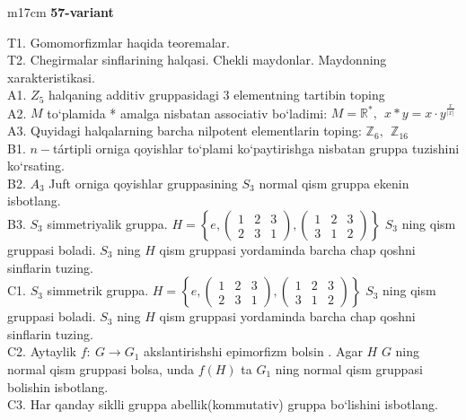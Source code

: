 \documentclass{article}
\begin{document}
\begin{tabular}{m{17cm}}
\textbf{57-variant}
\newline

T1. Gomomorfizmlar haqida teoremalar. \\
T2. Chegirmalar sinflarining halqasi. Chekli maydonlar. Maydonning xarakteristikasi. \\
A1. \(Z_{5}\) halqaning additiv gruppasidagi 3 elementning tartibin toping \\
A2. \(M\) to`plamida * amalga nisbatan associativ bo`ladimi: \(M = \mathbb{R}^{*},\ \ x*y = x \cdot y^{\frac{x}{|x|}}\) \\
A3. Quyidagi halqalarning barcha nilpotent elementlarin toping: \(\mathbb{Z}_{6},\ \ \mathbb{Z}_{16}\) \\
B1. \(n -\)tártipli orniga qoyishlar to`plami ko`paytirishga nisbatan gruppa tuzishini ko`rsating. \\
B2. \(A_{3}\) Juft orniga qoyishlar gruppasining \(S_{3}\) normal qism gruppa ekenin isbotlang. \\
B3. \(S_{3}\) simmetriyalik gruppa. \(H = \left\{ e,\begin{pmatrix}
1 & 2 & 3 \\
2 & 3 & 1
\end{pmatrix},\begin{pmatrix}
1 & 2 & 3 \\
3 & 1 & 2
\end{pmatrix} \right\}\) \(S_{3}\) ning qism gruppasi bola\textquotesingle di. \(S_{3}\) ning \(H\) qism gruppasi yordaminda barcha chap qo\textquotesingle shni sinflarin tuzing. \\
C1. \(S_{3}\) simmetrik gruppa. \(H = \left\{ e,\begin{pmatrix}
1 & 2 & 3 \\
2 & 3 & 1
\end{pmatrix},\begin{pmatrix}
1 & 2 & 3 \\
3 & 1 & 2
\end{pmatrix} \right\}\) \(S_{3}\) ning qism gruppasi boladi. \(S_{3}\) ning \(H\) qism gruppasi yordaminda barcha chap qo\textquotesingle shni sinflarin tuzing. \\
C2. Aytaylik \(f:\ G \rightarrow G_{1}\) akslantirishshi epimorfizm bo\textquotesingle lsin . Agar \(H\) \(G\) ning normal qism gruppasi bolsa, unda \(f(H)\) ta \(G_{1}\) ning normal qism gruppasi bolishin isbotlang. \\
C3. Har qanday siklli gruppa abellik(kommutativ) gruppa bo`lishini isbotlang. \\

\end{tabular}
\vspace{1cm}
\end{document}
